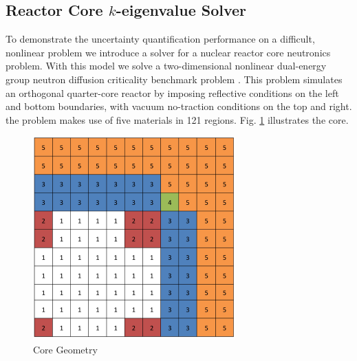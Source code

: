\documentclass{mc2015}
\begin{document}
\subsection{Reactor Core $k$-eigenvalue Solver}
To demonstrate the uncertainty quantification performance on a difficult, nonlinear problem we introduce a solver for a nuclear reactor core neutronics problem.  With this model we solve a two-dimensional nonlinear dual-energy group neutron diffusion criticality benchmark problem \cite{benchmark}.  This problem simulates an orthogonal quarter-core reactor by imposing reflective conditions on the left and bottom boundaries, with vacuum no-traction conditions on the top and right.  the problem makes use of five materials in 121 regions.  Fig. \ref{geom} illustrates the core.  
\begin{figure}[h]
\centering
  \includegraphics[width=0.4\linewidth]{core}
  \caption{Core Geometry}
  \label{geom}
\end{figure}
\end{document}
